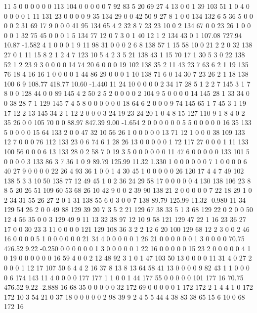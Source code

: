  11 5 0 0 0 0 0 0 113 104 0 0 0 0 0 7 92 83 5 20
 69 27 4 13 0 0 1 39 103 51 1 0 4 0 0 0 0 0 1 11
 131 23 0 0 0 0 9 35 134 29 0 0 42 50 9 27 8 1 0 0
 134 132 6 5 36 5 0 0 0 0 2 31 69 17 9 0 0 0 41 95
 134 65 4 2 32 8 7 23 23 10 0 2 134 67 0 0 23 26 1 0
 0 0 0 1 32 75 45 0 0 0 1 5 134 77 12 0 7 3 0 1
 40 12 1 2 134 43 0 1
107.08 727.94 10.87 -1.582
 4 1 0 0 0 1 9 11 98 31 0 0 0 2 6 8 138 57 1 15
 58 10 0 21 2 2 0 32 138 27 0 1 11 15 8 2 1 2 4 7
 123 10 5 4 2 3 5 21 138 43 1 15 70 17 1 30 5 3 0 22
 138 52 1 2 23 9 3 0 0 0 0 14 74 20 6 0 0 0 19 102
 138 35 2 11 43 23 7 63 6 2 1 19 135 76 18 4 16 16 1 0
 0 0 0 1 44 86 29 0 0 0 1 10 138 71 6 0 14 30 7 23
 26 2 1 18 138 100 6 9
108.77 418.77 10.60 -1.440
 11 24 10 0 0 0 0 2 34 17 28 5 1 2 2 7 145 3 1 7
 8 0 0 128 44 0 0 89 145 4 2 50 2 5 2 0 0 0 0 2
 104 9 5 0 0 0 0 14 145 28 1 33 34 0 0 38 28 7 1 129
 145 7 4 5 8 0 0 0 0 0 0 18 64 6 2 0 0 0 9 74
 145 65 1 7 45 3 1 19 17 12 2 13 145 34 2 1 12 2 0 0
 0 3 24 19 23 24 20 1 0 4 8 15 127 110 9 1 8 4 0 2
 35 26 0 0 105 70 0 0
88.97 847.39 9.00 -1.654
 2 0 0 0 0 0 0 5 5 0 0 0 0 0 16 35 133 5 0 0
 0 0 15 64 133 2 0 0 47 32 10 56 26 1 0 0 0 0 0 13
 71 12 1 0 0 0 38 109 133 12 7 0 0 0 76 112 133 23 0 6
 74 6 1 28 26 13 0 0 0 0 0 1 72 117 27 0 0 0 1 11
 133 100 56 0 0 0 6 13 133 28 0 2 58 7 0 19 3 5 0 0
 0 0 0 0 11 47 6 0 0 0 0 0 133 101 5 0 0 0 0 3
 133 86 3 7 36 1 0 9
89.79 125.99 11.32 1.330
 1 0 0 0 0 0 0 7 1 0 0 0 0 6 40 27 9 0 0 0
 0 22 26 4 93 36 1 0 0 1 4 30 45 1 0 0 0 0 0 26
 120 17 4 4 7 49 102 138 5 3 3 10 50 138 77 12 49 45 1 0
 2 36 24 29 58 17 0 0 0 0 0 4 130 138 106 23 8 8 5 20
 26 51 109 60 53 68 26 10 42 9 0 0 2 39 90 138 21 2 0 0
 0 0 0 7 22 18 29 1 0 2 34 31 55 26 27 2 0 1 31 138
 55 6 0 3 0 0 7 138
89.79 125.99 11.32 -0.980
 11 34 129 54 26 2 0 0 49 88 129 39 20 7 3 5 2 21 129 67
 38 33 5 1 3 68 129 22 0 2 0 0 50 12 4 56 35 0 0 3
 129 49 9 11 13 32 38 97 12 10 9 58 121 129 47 22 1 16 23 36
 27 17 0 0 30 23 3 11 0 0 0 0 121 129 108 36 3 2 2 12
 6 20 100 129 68 12 2 3 0 0 2 46 16 0 0 0 0 5 1 0
 0 0 0 0 0 21 34 4 0 0 0 0 0 1 26 21 0 0 0 0
 0 0 1 3 0 0 0 0
70.75 476.52 9.22 -0.250
 0 0 0 0 0 0 1 3 0 0 0 0 0 1 22 16 0 0 0 0
 0 15 23 2 0 0 0 0 0 4 1 0 19 0 0 0 0 0 0 16
 59 4 0 0 2 12 48 92 3 1 0 1 47 103 50 13 0 0 0 0
 11 31 4 0 27 2 0 0 0 1 12 17 107 50 6 4 4 2 16 37
 8 13 8 13 64 58 41 13 0 0 0 0 9 82 43 1 1 0 0 0
 0 6 174 143 11 4 0 0 0 0 177 177 1 1 0 0 1 44 177 55
 0 0 0 0 0 101 177 16
70.75 476.52 9.22 -2.888
 16 68 35 0 0 0 0 0 32 172 69 0 0 0 0 0 1 172 172 2
 1 4 4 1 0 172 172 10 3 54 21 0 37 18 0 0 0 0 0 2
 98 39 9 2 4 5 5 44 4 38 83 38 65 15 6 10 0 68 172 16
